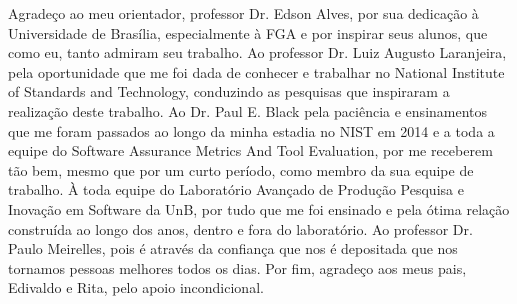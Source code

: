 \begin{agradecimentos}
Agradeço ao meu orientador, professor Dr. Edson Alves, por sua dedicação à Universidade de Brasília, especialmente à FGA e por inspirar seus alunos, que como eu, tanto admiram seu trabalho. Ao professor Dr. Luiz Augusto Laranjeira, pela oportunidade que me foi dada de conhecer e trabalhar no National Institute of Standards and Technology, conduzindo as pesquisas que inspiraram a realização deste trabalho. Ao Dr. Paul E. Black pela paciência e ensinamentos que me foram passados ao longo da minha estadia no NIST em 2014 e a toda a equipe do Software Assurance Metrics And Tool Evaluation, por me receberem tão bem, mesmo que por um curto período, como membro da sua equipe de trabalho. À toda equipe do Laboratório Avançado de Produção Pesquisa e Inovação em Software da UnB, por tudo que me foi ensinado e pela ótima relação construída ao longo dos anos, dentro e fora do laboratório. Ao professor Dr. Paulo Meirelles, pois é através da confiança que nos é depositada que nos tornamos pessoas melhores todos os dias. Por fim, agradeço aos meus pais, Edivaldo e Rita, pelo apoio incondicional.

\end{agradecimentos}
